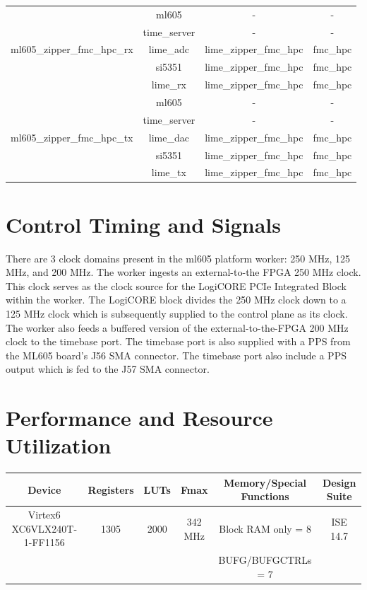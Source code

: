 \documentclass{article}
\begin{document}
\begin{tabular}{|c|c|c|c|}
		\hline
		\multirow{5}{*}{ml605\_zipper\_fmc\_hpc\_rx} &ml605 & - & - \\ &time\_server & - & - \\ &lime\_adc & lime\_zipper\_fmc\_hpc & fmc\_hpc \\  &si5351 & lime\_zipper\_fmc\_hpc & fmc\_hpc \\ &lime\_rx & lime\_zipper\_fmc\_hpc & fmc\_hpc \\
		\hline
		\multirow{5}{*}{ml605\_zipper\_fmc\_hpc\_tx} &ml605 & - & - \\ &time\_server & - & - \\ &lime\_dac & lime\_zipper\_fmc\_hpc & fmc\_hpc \\  &si5351 & lime\_zipper\_fmc\_hpc & fmc\_hpc \\ &lime\_tx & lime\_zipper\_fmc\_hpc & fmc\_hpc \\
		\hline
	\end{tabular}
\section*{Control Timing and Signals}
	There are 3 clock domains present in the ml605 platform worker: 250 MHz, 125 MHz, and 200 MHz. The worker ingests an external-to-the FPGA 250 MHz clock. This clock serves as the clock source for the LogiCORE PCIe Integrated Block within the worker. The LogiCORE block divides the 250 MHz clock down to a 125 MHz clock which is subsequently supplied to the control plane as its clock. The worker also feeds a buffered version of the external-to-the-FPGA 200 MHz clock to the timebase port. The timebase port is also supplied with a PPS from the ML605 board's J56 SMA connector. The timebase port also include a PPS output which is fed to the J57 SMA connector.
\section*{Performance and Resource Utilization}

\begin{scriptsize}
	\begin{tabular}{|c|c|c|c|c|c|}
		\hline
		\rowcolor{blue}
		Device                      & Registers & LUTs & Fmax    & Memory/Special Functions & Design Suite    \\
		\hline
		Virtex6 XC6VLX240T-1-FF1156 & 1305      & 2000 & 342 MHz &  Block RAM only = 8 & ISE 14.7        \\
		& & & & BUFG/BUFGCTRLs = 7 & \\
		\hline
	\end{tabular}
\end{scriptsize}
\end{document}
